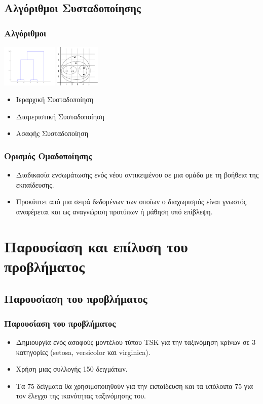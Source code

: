 \documentclass[xetex,serif,mathserif,14pt]{beamer}
\begin{document}
\subsection{Αλγόριθμοι Συσταδοποίησης}

\begin{frame}
\frametitle{Αλγόριθμοι}
\centering
{\includegraphics[height=2cm]{images/hierClust.png}}
{\includegraphics[height=2cm]{images/hierClust2.png}}
\begin{itemize}
  \item Ιεραρχική Συσταδοποίηση\pause
  \item Διαμεριστική Συσταδοποίηση\pause
  \item Ασαφής Συσταδοποίηση
\end{itemize}
\end{frame}


\begin{frame}
\frametitle{Ορισμός Ομαδοποίησης}
\begin{itemize}
  \item Διαδικασία ενσωμάτωσης ενός νέου αντικειμένου σε μια ομάδα με τη βοήθεια της εκπαίδευσης.\pause
  \item Προκύπτει από μια σειρά δεδομένων των οποίων ο διαχωρισμός είναι γνωστός αναφέρεται και ως αναγνώριση  προτύπων ή μάθηση υπό επίβλεψη.
\end{itemize}
\end{frame}


\section{Παρουσίαση και επίλυση του προβλήματος}
\subsection{Παρουσίαση του προβλήματος}
\begin{frame}
\frametitle{Παρουσίαση του προβλήματος}
\begin{itemize}
  \item Δημιουργία ενός ασαφούς μοντέλου τύπου TSK για την ταξινόμηση κρίνων σε 3 κατηγορίες (setosa, versicolor και virginica).\pause
  \item Χρήση μιας συλλογής 150 δειγμάτων.\pause
  \item Τα 75 δείγματα θα χρησιμοποιηθούν για την εκπαίδευση και τα υπόλοιπα 75 για τον έλεγχο της ικανότητας ταξινόμησης του.
\end{itemize}
\end{frame}
\end{document}
